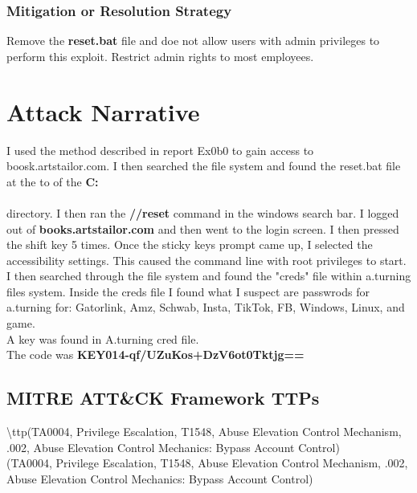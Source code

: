 \documentclass[notitlepage]{article}
\begin{document}
	\subsubsection{Mitigation or Resolution Strategy}
	\indent Remove the \textbf{reset.bat} file and doe not allow users with admin privileges to perform this exploit. Restrict admin rights to most employees.  
	
	\section{Attack Narrative}
	\indent I used the method described in report Ex0b0 to gain access to boosk.artstailor.com. I then searched the file system and found the reset.bat file at the to of the \textbf{C:\\\\} directory. I then ran the \textbf{//reset} command in the windows search bar. I logged out of \textbf{books.artstailor.com} and then went to the login screen. I then pressed the shift key 5 times. Once the sticky keys prompt came up, I selected the accessibility settings. This caused the command line with root privileges to start.  I then searched through the file system and found the "creds" file within a.turning files system. Inside the creds file I found what I suspect are passwrods for a.turning for: Gatorlink, Amz, Schwab, Insta, TikTok, FB, Windows, Linux, and game. \\ 
	
	
	 A key was found in A.turning cred file. \\

	The code was \textbf{KEY014-qf/UZuKos+DzV6ot0Tktjg==} \\
	
	\subsection{MITRE ATT{\&}CK Framework TTPs}
	
	\indent\textbackslash ttp(TA0004, Privilege Escalation, T1548, Abuse Elevation Control Mechanism, .002, Abuse Elevation Control Mechanics: Bypass Account Control) \\
	\ttp(TA0004, Privilege Escalation, T1548, Abuse Elevation Control Mechanism, .002, Abuse Elevation Control Mechanics: Bypass Account Control) \\
\end{document}
